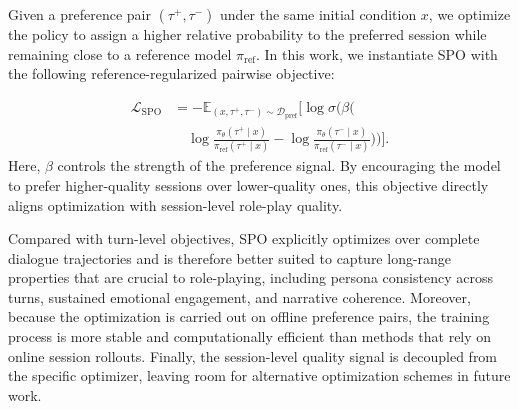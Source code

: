 Given a preference pair \((\tau^{+}, \tau^{-})\) under the same initial condition \(x\), we optimize the policy to assign a higher relative probability to the preferred session while remaining close to a reference model \(\pi_{\mathrm{ref}}\). In this work, we instantiate SPO with the following reference-regularized pairwise objective:

\begin{equation}
\begin{split}
\mathcal{L}_{\mathrm{SPO}} &= - \mathbb{E}_{(x,\tau^{+},\tau^{-}) \sim \mathcal{D}_{\mathrm{pref}}} \Bigg[ \log \sigma \Bigg( \beta \Bigg( \\
&\quad \log \frac{\pi_{\theta}(\tau^{+} \mid x)}{\pi_{\mathrm{ref}}(\tau^{+} \mid x)} - \log \frac{\pi_{\theta}(\tau^{-} \mid x)}{\pi_{\mathrm{ref}}(\tau^{-} \mid x)} \Bigg) \Bigg) \Bigg].
\end{split}
\end{equation}
Here, \(\beta\) controls the strength of the preference signal. By encouraging the model to prefer higher-quality sessions over lower-quality ones, this objective directly aligns optimization with session-level role-play quality.

Compared with turn-level objectives, SPO explicitly optimizes over complete dialogue trajectories and is therefore better suited to capture long-range properties that are crucial to role-playing, including persona consistency across turns, sustained emotional engagement, and narrative coherence. Moreover, because the optimization is carried out on offline preference pairs, the training process is more stable and computationally efficient than methods that rely on online session rollouts. Finally, the session-level quality signal is decoupled from the specific optimizer, leaving room for alternative optimization schemes in future work.


